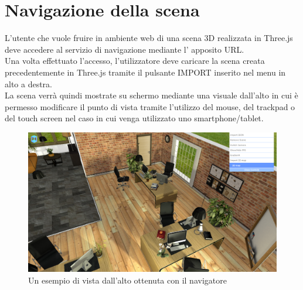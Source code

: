 \newpage
\section{Navigazione della scena}
\label{sec:chapter_caso_uso_navigazione_scena}

L’utente che vuole fruire in ambiente web di una scena 3D realizzata in Three.js deve accedere al servizio di navigazione mediante l’ apposito URL. 
\\
Una volta effettuato l’accesso, l’utilizzatore deve caricare la scena creata precedentemente in Three.js tramite il pulsante IMPORT inserito nel menu in alto a destra.
\\
La scena verrà quindi mostrate su schermo mediante una visuale dall’alto in cui è permesso modificare il punto di vista tramite l’utilizzo del mouse, del trackpad o  del touch screen nel caso in cui venga utilizzato uno smartphone/tablet.
\\
\begin{figure}[htb]
 \centering
 \includegraphics[width=1\linewidth]{images/chapter_caso_uso/vista_alto.png}\hfill
 \caption[Esempio di vista dall'alto]{Un esempio di vista dall'alto ottenuta con il navigatore}
 \label{fig:caso_uso_vista_alto}
\end{figure}

